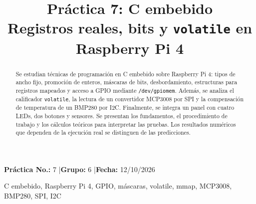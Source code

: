 \documentclass[conference]{IEEEtran}
\begin{document}
\title{Práctica 7: C embebido\\\large Registros reales, bits y \texttt{volatile} en Raspberry Pi 4}
\author{
\and{}
\and{}
\and{}
\and{}
\and{}}
\maketitle
\begin{center}\small\textbf{Práctica No.:} 7 \quad|\quad \textbf{Grupo:} 6 \quad|\quad\textbf{Fecha:} 12/10/2026\end{center}
\begin{abstract}
Se estudian técnicas de programación en C embebido sobre Raspberry Pi 4: tipos de ancho fijo, promoción de enteros, máscaras de bits, desbordamiento, estructuras para registros mapeados y acceso a GPIO mediante \texttt{/dev/gpiomem}. Además, se analiza el calificador \texttt{volatile}, la lectura de un convertidor MCP3008 por SPI y la compensación de temperatura de un BMP280 por I2C. Finalmente, se integra un panel con cuatro LEDs, dos botones y sensores. Se presentan los fundamentos, el procedimiento de trabajo y los cálculos teóricos para interpretar las pruebas. Los resultados numéricos que dependen de la ejecución real se distinguen de las predicciones.
\end{abstract}
\begin{IEEEkeywords}C embebido, Raspberry Pi 4, GPIO, máscaras, volatile, mmap, MCP3008, BMP280, SPI, I2C\end{IEEEkeywords}
\end{document}
